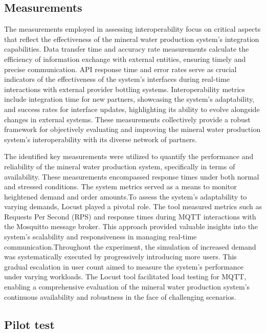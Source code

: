 \documentclass[conference]{IEEEtran}
\begin{document}
\subsection{Measurements}
\label{sec:measurements}

The measurements employed in assessing interoperability focus on critical aspects that reflect the effectiveness of the mineral water production system's integration capabilities. Data transfer time and accuracy rate measurements calculate the efficiency of information exchange with external entities, ensuring timely and precise communication. API response time and error rates serve as crucial indicators of the effectiveness of the system's interfaces during real-time interactions with external provider bottling systems. Interoperability metrics include integration time for new partners, showcasing the system's adaptability, and success rates for interface updates, highlighting its ability to evolve alongside changes in external systems. These measurements collectively provide a robust framework for objectively evaluating and improving the mineral water production system's interoperability with its diverse network of partners.

The identified key measurements were utilized to quantify the performance and reliability of the mineral water production system, specifically in terms of availability. These measurements encompassed response times under both normal and stressed conditions. The system metrics served as a means to monitor heightened demand and order amounts.To assess the system's adaptability to varying demands, Locust played a pivotal role. The tool measured metrics such as Requests Per Second (RPS) and response times during MQTT interactions with the Mosquitto message broker. This approach provided valuable insights into the system's scalability and responsiveness in managing real-time communication.Throughout the experiment, the simulation of increased demand was systematically executed by progressively introducing more users. This gradual escalation in user count aimed to measure the system's performance under varying workloads. The Locust tool facilitated load testing for MQTT, enabling a comprehensive evaluation of the mineral water production system's continuous availability and robustness in the face of challenging scenarios.

\subsection{Pilot test}
\label{sec:pilot_test}
\end{document}
